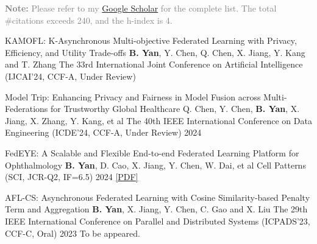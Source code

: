 
\begin{cvparagraph}
\textcolor{gray}{\textbf{Note:} Please refer to my \href{https://scholar.google.com/citations?hl=en&user=DVsgN1sAAAAJ}{Google Scholar} for the complete list.
The total \#citations exceeds 240, and the h-index is 4.}
\end{cvparagraph}

\begin{cvpublications}

\cvpublication
{KAMOFL: K-Asynchronous Multi-objective Federated Learning with Privacy, Efficiency, and Utility Trade-offs} %
{\textbf{B. Yan}, Y. Chen, Q. Chen, X. Jiang, Y. Kang and T. Zhang} %
{The 33rd International Joint Conference on Artificial Intelligence (IJCAI'24, CCF-A, Under Review)} %
{} %
{} %


\cvpublication
{Model Trip: Enhancing Privacy and Fairness in Model Fusion across Multi-Federations for Trustworthy Global Healthcare} %
{Q. Chen, Y. Chen, \textbf{B. Yan}, X. Jiang, X. Zhang, Y. Kang, et al} %
{The 40th IEEE International Conference on Data Engineering (ICDE'24, CCF-A, Under Review)} %
{2024} %
{} %


\cvpublication
{FedEYE: A Scalable and Flexible End-to-end Federated Learning Platform for Ophthalmology} %
{\textbf{B. Yan}, D. Cao, X. Jiang, Y. Chen, W. Dai, et al} %
{Cell Patterns (SCI, JCR-Q2, IF=6.5)} %
{2024} %
{\href{https://www.cell.com/patterns/fulltext/S2666-3899(24)00019-9}{[PDF]}} %


\cvpublication
{AFL-CS: Asynchronous Federated Learning with Cosine Similarity-based Penalty Term and Aggregation} %
{\textbf{B. Yan}, X. Jiang, Y. Chen, C. Gao and X. Liu} %
{The 29th IEEE International Conference on Parallel and Distributed Systems (ICPADS'23, CCF-C, Oral)} %
{2023} %
{To be appeared.} %


\end{cvpublications}
